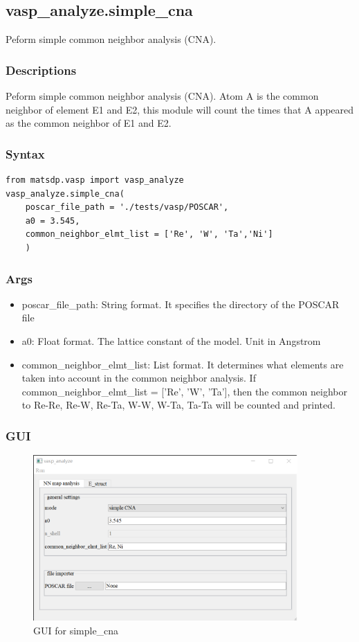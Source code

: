 \documentclass[12pt]{book}
\begin{document}
\subsection{vasp\_analyze.simple\_cna}
Peform simple common neighbor analysis (CNA).

\subsubsection{Descriptions}
Peform simple common neighbor analysis (CNA). Atom A is the common neighbor of element E1 and E2, this module will count the times that A appeared as the common neighbor of E1 and E2.
\subsubsection{Syntax}
\begin{lstlisting}
from matsdp.vasp import vasp_analyze
vasp_analyze.simple_cna(
    poscar_file_path = './tests/vasp/POSCAR',
    a0 = 3.545,
    common_neighbor_elmt_list = ['Re', 'W', 'Ta','Ni']
    )
\end{lstlisting}
\subsubsection{Args}
\begin{itemize}
\item poscar\_file\_path: String format. It specifies the directory of the POSCAR file
\item a0: Float format. The lattice constant of the model. Unit in Angstrom
\item common\_neighbor\_elmt\_list: List format. It determines what elements are taken into account in the common neighbor analysis. If common\_neighbor\_elmt\_list = ['Re', 'W', 'Ta'], then the common neighbor to Re-Re, Re-W, Re-Ta, W-W, W-Ta, Ta-Ta will be counted and printed.
\end{itemize}

\subsubsection{GUI}
\begin{figure}[htbp]
\centering
\includegraphics[width=0.9\textwidth]{gui_simple_cna.pdf}
\caption{GUI for simple\_cna}
\label{fig:GUI_simple_cna}
\end{figure}
\end{document}
